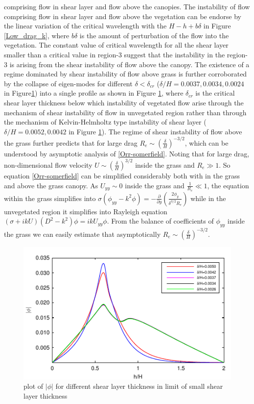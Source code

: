 \documentclass[aps,prl,twocolumn,showpacs,superscriptaddress,groupedaddress,10pt]{revtex4-1}  %
\newcommand{\del}{\partial}
\begin{document}
comprising flow in shear layer and flow above the canopies. The instability of flow comprising flow in shear layer and flow above the vegetation can be endorse by the linear 
variation of the critical wavelength with the $H-h+b\delta$ in Figure \ref{Low_drag_k}, where $b\delta$ is the amount of perturbation of the flow into the vegetation.
\newline
The constant value of critical wavelength for all the shear layer smaller than a critical value in region-3 suggest that the instability 
in the region-3 is arising from the shear instability of flow above the canopy. The existence of a regime dominated by shear instability of flow above grass is further corroborated 
by the collapse of eigen-modes for different $\delta<\delta_{cr}$ ($\delta/H=0.0037,0.0034,0.0024$ in Figure\ref{Asymptotic_mode}) into a single profile as shown in 
Figure \ref{Asymptotic_mode}, where $\delta_{cr}$ is the critical shear layer thickness
below which instability of vegetated flow arise through the mechanism of shear instability of flow in unvegetated region rather than through the mechanism of Kelvin-Helmholtz type 
instability of shear layer ($\delta/H=0.0052,0.0042$ in Figure \ref{Asymptotic_mode}). The regime of shear instability of flow above the 
grass further predicts that for large drag $R_e \sim (\frac{\delta}{H})^{-3/2}$, which can be understood by asymptotic analysis of \eqref{Orr-somerfield}.
Noting that for large drag, non-dimensional flow velocity $U \sim (\frac{\delta}{H})^{3/2}$ inside the grass and $R_{e} \gg 1$. So equation \eqref{Orr-somerfield}
can be simplified considerably both with in the grass and above the grass canopy. As $U_{yy}\sim 0$ inside the grass and $\frac{1}{R_e} \ll 1$,
the equation within the grass simplifies into
$\sigma\left(\phi_{yy}-k^2\phi\right) = -\frac{\del}{\del y}\left(\frac{2\phi_y}{\delta^{3/2}R_e}\right)$ while in the unvegetated region it simplifies into Rayleigh equation 
$ \left(\sigma+ikU\right) \left(D^2-k^2\right)\phi =  ikU_{yy}\phi$. From the balance of coefficients of $\phi_{yy}$ inside the grass we can easily estimate that asymptotically 
$R_e \sim (\frac{\delta}{H})^{-3/2}$.
\begin{figure}[]
\includegraphics[]{Asymptotic_eig_set3.pdf}
\caption{plot of $|\phi|$ for different shear layer thickness in limit of small shear layer thickness}
\label{Asymptotic_mode}
\end{figure}
\end{document}
